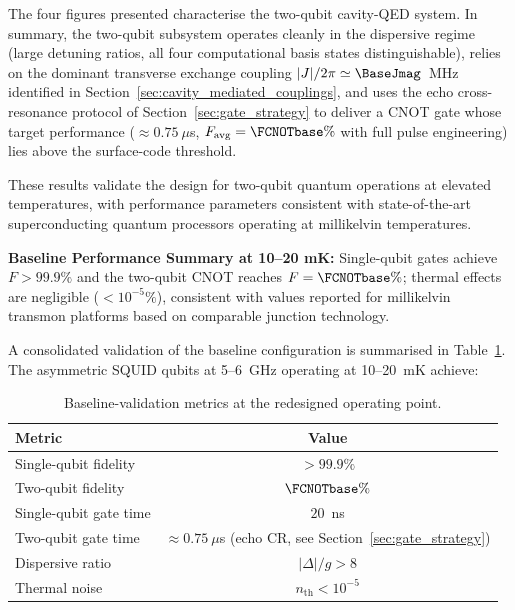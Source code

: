 The four figures presented characterise the two-qubit cavity-QED system.
In summary, the two-qubit subsystem operates cleanly in the dispersive regime
(large detuning ratios, all four computational basis states distinguishable),
relies on the dominant transverse exchange coupling $|J|/2\pi \simeq \BaseJmag$~MHz
identified in Section~\ref{sec:cavity_mediated_couplings}, and uses the echo
cross-resonance protocol of Section~\ref{sec:gate_strategy} to deliver a CNOT
gate whose target performance ($\approx 0.75~\mu$s, $F_{\mathrm{avg}} = \FCNOTbase\%$
with full pulse engineering) lies above the surface-code threshold.

These results validate the design for two-qubit quantum operations at elevated temperatures, with performance parameters consistent with state-of-the-art superconducting quantum processors operating at millikelvin temperatures.

\begin{baselinebox}
\textbf{Baseline Performance Summary at 10--20 mK:}
Single-qubit gates achieve $F > 99.9\%$ and the two-qubit CNOT reaches $F = \FCNOTbase\%$; thermal effects are negligible ($< 10^{-5}\%$), consistent with values reported for millikelvin transmon platforms based on comparable junction technology.
\end{baselinebox}

A consolidated validation of the baseline configuration is summarised in Table~\ref{tab:baseline_validation_metrics}. The asymmetric SQUID qubits at 5--6~GHz operating at 10--20~mK achieve:

\begin{table}[h]
\centering
\begin{tabular}{@{}lc@{}}
\toprule
\textbf{Metric} & \textbf{Value} \\
\midrule
Single-qubit fidelity   & $> 99.9\%$ \\
Two-qubit fidelity      & $\FCNOTbase\%$ \\
Single-qubit gate time  & $20$~ns \\
Two-qubit gate time     & $\approx 0.75~\mu$s (echo CR, see Section~\ref{sec:gate_strategy}) \\
Dispersive ratio        & $|\Delta|/g > 8$ \\
Thermal noise           & $n_{\text{th}} < 10^{-5}$ \\
\bottomrule
\end{tabular}
\caption{Baseline-validation metrics at the redesigned operating point.}
\label{tab:baseline_validation_metrics}
\end{table}


